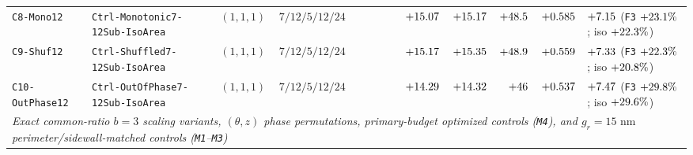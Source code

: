 \begin{table}[!htbp]
{\begin{tabular}{llccrrrrrrrrl}
\texttt{C8-Mono12} & \texttt{Ctrl-Monotonic7-12Sub-IsoArea} & $(1,1,1)$ & $7 / 12 / 5 / 12 / 24$ & \roundfour{\NthreeUnithreedCtrlMonoonetwoAreaUmtwo} & \roundtwo{\NthreeUnithreedCtrlMonoonetwoPedgeUm} & \roundtwo{\NthreeUnithreedCtrlMonoonetwoAswUmtwo} & \roundone{\NthreeUnithreedCtrlMonoonetwoGrHarmNm} & $+\roundtwo{\NthreeUnithreedCtrlMonoonetwoFzPn}$ & $+\roundtwo{\NthreeIsothreezerofournineCtrlMonoonetwoFzPn}$ & $+\roundone{\NthreeUnithreedCtrlMonoonetwoFa}$ & $+\roundthree{\NthreeUnithreedCtrlMonoonetwoFp}$ & $+\roundtwo{\NthreeUnithreedCtrlMonoonetwoFasw}$ (\texttt{F3} $+\roundone{\NthreeUnithreedGainFoneoneoneVsMonoonetwoPct}\%$; iso $+\roundone{\NthreeIsothreezerofournineGainFoneoneoneVsMonoonetwoPct}\%$) \\
\texttt{C9-Shuf12} & \texttt{Ctrl-Shuffled7-12Sub-IsoArea} & $(1,1,1)$ & $7 / 12 / 5 / 12 / 24$ & \roundfour{\NthreeUnithreedCtrlShufonetwoAreaUmtwo} & \roundtwo{\NthreeUnithreedCtrlShufonetwoPedgeUm} & \roundtwo{\NthreeUnithreedCtrlShufonetwoAswUmtwo} & \roundone{\NthreeUnithreedCtrlShufonetwoGrHarmNm} & $+\roundtwo{\NthreeUnithreedCtrlShufonetwoFzPn}$ & $+\roundtwo{\NthreeIsothreezerofournineCtrlShufonetwoFzPn}$ & $+\roundone{\NthreeUnithreedCtrlShufonetwoFa}$ & $+\roundthree{\NthreeUnithreedCtrlShufonetwoFp}$ & $+\roundtwo{\NthreeUnithreedCtrlShufonetwoFasw}$ (\texttt{F3} $+\roundone{\NthreeUnithreedGainFoneoneoneVsShufonetwoPct}\%$; iso $+\roundone{\NthreeIsothreezerofournineGainFoneoneoneVsShufonetwoPct}\%$) \\
\texttt{C10-OutPhase12} & \texttt{Ctrl-OutOfPhase7-12Sub-IsoArea} & $(1,1,1)$ & $7 / 12 / 5 / 12 / 24$ & \roundfour{\NthreeUnithreedCtrlOutphaseonetwoAreaUmtwo} & \roundtwo{\NthreeUnithreedCtrlOutphaseonetwoPedgeUm} & \roundtwo{\NthreeUnithreedCtrlOutphaseonetwoAswUmtwo} & \roundone{\NthreeUnithreedCtrlOutphaseonetwoGrHarmNm} & $+\roundtwo{\NthreeUnithreedCtrlOutphaseonetwoFzPn}$ & $+\roundtwo{\NthreeIsothreezerofournineCtrlOutphaseonetwoFzPn}$ & $+\roundone{\NthreeUnithreedCtrlOutphaseonetwoFa}$ & $+\roundthree{\NthreeUnithreedCtrlOutphaseonetwoFp}$ & $+\roundtwo{\NthreeUnithreedCtrlOutphaseonetwoFasw}$ (\texttt{F3} $+\roundone{\NthreeUnithreedGainFoneoneoneVsOutphaseonetwoPct}\%$; iso $+\roundone{\NthreeIsothreezerofournineGainFoneoneoneVsOutphaseonetwoPct}\%$) \\
\midrule
\multicolumn{13}{l}{\emph{Exact common-ratio $b=3$ scaling variants, $(\theta,z)$ phase permutations, primary-budget optimized controls (\texttt{M4}), and $g_r=15\text{ nm}$ perimeter/sidewall-matched controls (\texttt{M1}--\texttt{M3})}} \\

\end{tabular}}
\end{table}
